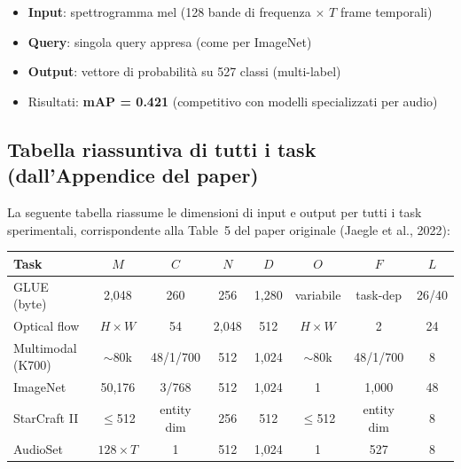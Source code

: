 \documentclass[12pt,a4paper]{article}
\begin{document}
\begin{itemize}
    \item \textbf{Input}: spettrogramma mel (128 bande di frequenza $\times$ $T$ frame temporali)
    \item \textbf{Query}: singola query appresa (come per ImageNet)
    \item \textbf{Output}: vettore di probabilit\`a su 527 classi (multi-label)
    \item Risultati: \textbf{mAP = 0.421} (competitivo con modelli specializzati per audio)
\end{itemize}


\subsection{Tabella riassuntiva di tutti i task (dall'Appendice del paper)}

La seguente tabella riassume le dimensioni di input e output per tutti i task sperimentali, corrispondente alla Table~5 del paper originale (Jaegle et al., 2022):

\begin{center}
\footnotesize
\begin{tabular}{p{2.5cm}ccccccc}
\toprule
\textbf{Task} & \textbf{$M$} & \textbf{$C$} & \textbf{$N$} & \textbf{$D$} & \textbf{$O$} & \textbf{$F$} & \textbf{$L$} \\
\midrule
GLUE (byte) & 2,048 & 260 & 256 & 1,280 & variabile & task-dep & 26/40 \\
Optical flow & $H \times W$ & 54 & 2,048 & 512 & $H \times W$ & 2 & 24 \\
Multimodal (K700) & $\sim$80k & 48/1/700 & 512 & 1,024 & $\sim$80k & 48/1/700 & 8 \\
ImageNet & 50,176 & 3/768 & 512 & 1,024 & 1 & 1,000 & 48 \\
StarCraft II & $\leq$512 & entity dim & 256 & 512 & $\leq$512 & entity dim & 8 \\
AudioSet & $128 \times T$ & 1 & 512 & 1,024 & 1 & 527 & 8 \\
\bottomrule
\end{tabular}
\end{center}
\end{document}
